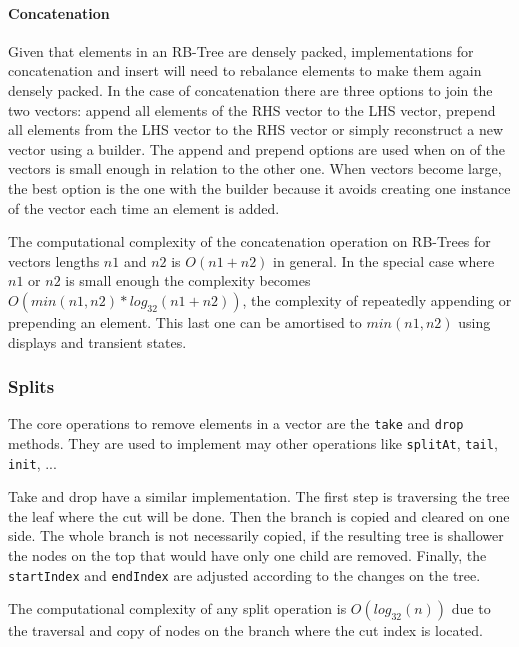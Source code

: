 \paragraph{Concatenation}
Given that elements in an RB-Tree are densely packed, implementations for concatenation and insert will need to rebalance elements to make them again densely packed. In the case of concatenation there are three options to join the two vectors: append all elements of the RHS vector to the LHS vector, prepend all elements from the LHS vector to the RHS vector or simply reconstruct a new vector using a builder. The append and prepend options are used when on of the vectors is small enough in relation to the other one. When vectors become large, the best option is the one with the builder because it avoids creating one instance of the vector each time an element is added.

The computational complexity of the concatenation operation on RB-Trees for vectors lengths $n1$ and $n2$ is $O(n1 + n2)$ in general. In the special case where $n1$ or $n2$ is small enough the complexity becomes $O(min(n1,n2)*log_{32}(n1+n2))$, the complexity of repeatedly appending or prepending an element. This last one can be amortised to $min(n1,n2)$ using displays and transient states. 


\subsubsection{Splits}
The core operations to remove elements in a vector are the \texttt{take} and \texttt{drop} methods. They are used to implement may other operations like \texttt{splitAt}, \texttt{tail}, \texttt{init}, ...

Take and drop have a similar implementation. The first step is traversing the tree the leaf where the cut will be done. Then the branch is copied and cleared on one side. The whole branch is not necessarily copied, if the resulting tree is shallower the nodes on the top that would have only one child are removed. Finally, the \texttt{startIndex} and \texttt{endIndex} are adjusted according to the changes on the tree.

The computational complexity of any split operation is $O(log_{32}(n))$ due to the traversal and copy of nodes on the branch where the cut index is located.


